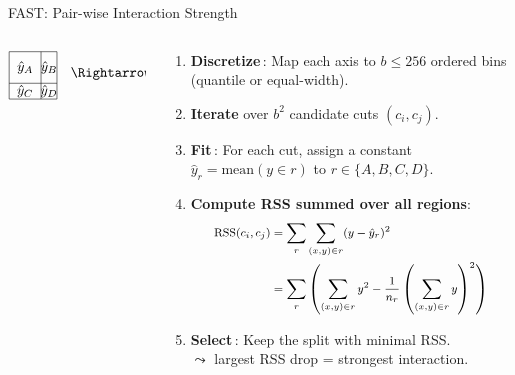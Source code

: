 \documentclass[11pt,compress,t,notes=noshow, aspectratio=169, xcolor=table]{beamer}
\begin{document}
\begin{frame}{FAST: Pair-wise Interaction Strength}
\begin{columns}[T,totalwidth=\textwidth]
\begin{column}{0.4\textwidth}
{\[\begin{array}{@{}l@{\hskip 0.6em}l@{\hskip 0.6em}l@{\hskip 0.6em}l@{\hskip 0.6em}l}
\begin{tikzpicture}[baseline=(current bounding box.center)]
        \draw (0,0) rectangle (1.2,1.2);
        \draw (0.8,0) -- (0.8,1.2); 
        \draw (0,0.4) -- (1.2,0.4); 
        \node at (0.4,0.2) {$\hat{y}_C$};
        \node at (1,0.2) {$\hat{y}_D$};
        \node at (0.4,0.8) {$\hat{y}_A$};
        \node at (1,0.8) {$\hat{y}_B$};
    \end{tikzpicture} & \text{$\Rightarrow$} & \text{$RSS_{b^2}$}\\ 
\end{array}
\]
}
\end{column}
\begin{column}{0.6\textwidth}
\small
\begin{enumerate}\itemsep4pt
  \item<1-> {\bf Discretize}\,: Map each axis to \(b\!\le\!256\) ordered
        bins (quantile or equal-width).
  \item<2-> {\bf Iterate} over \(b^{2}\) candidate cuts
        \((c_i,c_j)\). %
  \item<2-> {\bf Fit}\,: For each cut, assign a constant
        \(\hat y_r\!=\!\text{mean}(y\!\in\!r)\) to
        \(r\!\in\!\{A,B,C,D\}\).
  \item<2-> {\bf Compute RSS summed over all regions}:   
  \[
  \footnotesize
\begin{aligned}
\text{RSS}(c_i, c_j) 
&= \sum_{r} \sum_{(x,y) \in r} (y - \hat{y}_r)^2 \\
&= \sum_{r} \left( \sum_{(x,y) \in r} y^2 - \frac{1}{n_r} \left(\sum_{(x,y) \in r} y \right)^2 \right)
\end{aligned}
\]
         
              
  \item<2-> {\bf Select}\,: Keep the split with minimal RSS.\\
  $\leadsto$ largest RSS drop = strongest interaction. \\%
\end{enumerate}

\end{column}
\end{columns}
\end{frame}
\end{document}
